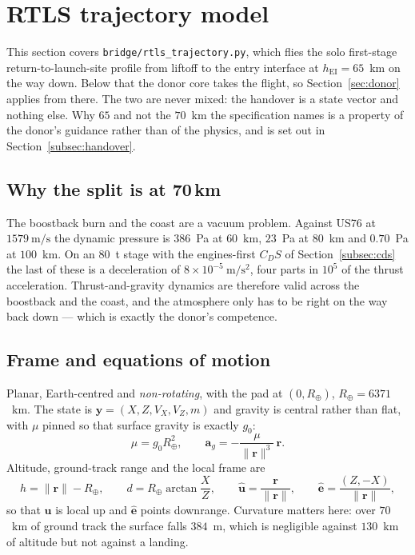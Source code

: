 \documentclass[11pt,a4paper]{article}
\newcommand{\vect}[1]{\mathbf{#1}}
\newcommand{\code}[1]{\texttt{#1}}
\begin{document}
\section{RTLS trajectory model}
\label{sec:rtls}

This section covers \code{bridge/rtls\_trajectory.py}, which flies the solo
first-stage return-to-launch-site profile from liftoff to the entry interface at
$h_{\mathrm{EI}}=65$~km on the way down. Below that the donor core takes the
flight, so Section~\ref{sec:donor} applies from there. The two are never mixed:
the handover is a state vector and nothing else. Why $65$ and not the $70$~km the
specification names is a property of the donor's guidance rather than of the
physics, and is set out in Section~\ref{subsec:handover}.

\subsection{Why the split is at 70\,km}

The boostback burn and the coast are a vacuum problem. Against US76 at
$1579\ \mathrm{m/s}$ the dynamic pressure is $386$~Pa at $60$~km, $23$~Pa at
$80$~km and $0.70$~Pa at $100$~km. On an $80$~t stage with the engines-first
$C_D S$ of Section~\ref{subsec:cds} the last of these is a deceleration of
$8\times10^{-5}\ \mathrm{m/s^2}$, four parts in $10^{5}$ of the thrust
acceleration. Thrust-and-gravity dynamics are therefore valid across the
boostback and the coast, and the atmosphere only has to be right on the way back
down --- which is exactly the donor's competence.

\subsection{Frame and equations of motion}

Planar, Earth-centred and \emph{non-rotating}, with the pad at
$(0,R_\oplus)$, $R_\oplus=6371$~km. The state is
$\vect{y}=(X,Z,V_X,V_Z,m)$ and gravity is central rather than flat, with $\mu$
pinned so that surface gravity is exactly $g_0$:
\begin{equation}
\mu = g_0 R_\oplus^2,
\qquad
\vect{a}_g = -\frac{\mu}{\lVert\vect{r}\rVert^3}\,\vect{r} .
\end{equation}
Altitude, ground-track range and the local frame are
\begin{equation}
h = \lVert\vect{r}\rVert - R_\oplus,
\qquad
d = R_\oplus \arctan\!\frac{X}{Z},
\qquad
\hat{\vect{u}} = \frac{\vect{r}}{\lVert\vect{r}\rVert},
\qquad
\hat{\vect{e}} = \frac{(Z,-X)}{\lVert\vect{r}\rVert} ,
\end{equation}
so that $\hat{\vect{u}}$ is local up and $\hat{\vect{e}}$ points downrange.
Curvature matters here: over $70$~km of ground track the surface falls $384$~m,
which is negligible against $130$~km of altitude but not against a landing.
\end{document}
